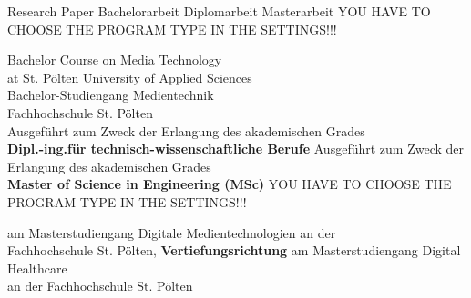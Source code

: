 \begin{center}

\vspace{1cm}

\begin{minipage}[t][5cm][s]{\textwidth}%
\centering
\Huge{{\color{FH2}{\fontsize{24}{30} \selectfont \workTitle\\}}}
\vspace{0.5cm}
\LARGE{{\color{FH2}{\fontsize{16}{24} \selectfont \subTitle\\}}}
\end{minipage}

\vspace{1cm}

\ifuseBachelorDigitalMediaTechnologiesOne
	\LARGE{Research Paper}
\else
	\ifuseBachelorDigitalMediaTechnologiesTwo
		\LARGE{Bachelorarbeit}
\else
	\ifuseMasterDigitalMediaTechnologies
		\LARGE{Diplomarbeit}
\else
	\ifuseMasterDigitalHealthCare
		\LARGE{Masterarbeit}
    \else
        \LARGE{YOU HAVE TO CHOOSE THE PROGRAM TYPE IN THE SETTINGS!!!}
  	\fi
\fi
\fi
\fi


\vspace{1.5cm}
\ifuseBachelorDigitalMediaTechnologiesOne
	\fontsize{11pt}{15pt}\selectfont Bachelor Course on Media Technology\\
at St. P\"{o}lten University of Applied Sciences\\  
\else
	\ifuseBachelorDigitalMediaTechnologiesTwo
		\fontsize{11pt}{15pt}\selectfont Bachelor-Studiengang Medientechnik\\
Fachhochschule St. P\"{o}lten\\  
\else
	\ifuseMasterDigitalMediaTechnologies
		\fontsize{11pt}{15pt}\selectfont Ausgef\"uhrt zum Zweck der Erlangung des akademischen Grades\\
		\textbf{Dipl.-ing.für technisch-wissenschaftliche Berufe}
\else
	\ifuseMasterDigitalHealthCare
    	\fontsize{11pt}{15pt}\selectfont Ausgeführt zum Zweck der Erlangung des akademischen Grades\\
		\textbf{Master of Science in Engineering (MSc)}
    \else
        \LARGE{YOU HAVE TO CHOOSE THE PROGRAM TYPE IN THE SETTINGS!!!}
  	\fi
\fi
\fi
\fi

\vspace{6mm}

\ifuseMasterDigitalMediaTechnologies
	am Masterstudiengang Digitale Medientechnologien an der\\ 
Fachhochschule St. Pölten, \textbf{Vertiefungsrichtung \specialization} 
\else
	\ifuseMasterDigitalHealthCare
		am Masterstudiengang Digital Healthcare\\ 
an der Fachhochschule St. Pölten
    \else
        

\end{center}
